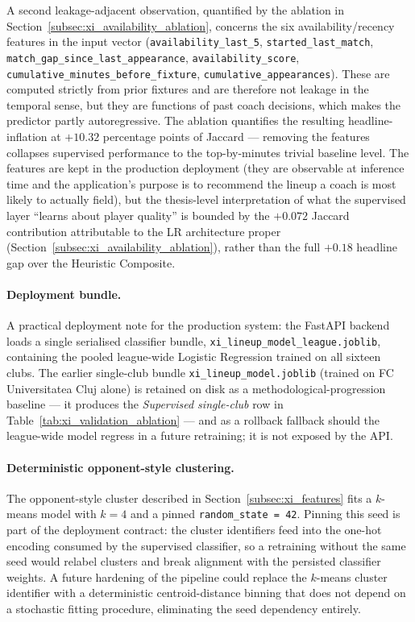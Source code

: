 A second leakage-adjacent observation, quantified by the ablation in Section~\ref{subsec:xi_availability_ablation}, concerns the six availability/recency features in the input vector (\texttt{availability\_last\_5}, \texttt{started\_last\_match}, \texttt{match\_gap\_\allowbreak since\_\allowbreak last\_\allowbreak appearance}, \texttt{availability\_score}, \texttt{cumulative\_minutes\_\allowbreak before\_\allowbreak fixture}, \texttt{cumulative\_\allowbreak appearances}). These are computed strictly from prior fixtures and are therefore not leakage in the temporal sense, but they are functions of past coach decisions, which makes the predictor partly autoregressive. The ablation quantifies the resulting headline-inflation at $+10.32$ percentage points of Jaccard --- removing the features collapses supervised performance to the top-by-minutes trivial baseline level. The features are kept in the production deployment (they are observable at inference time and the application's purpose is to recommend the lineup a coach is most likely to actually field), but the thesis-level interpretation of what the supervised layer ``learns about player quality'' is bounded by the $+0.072$ Jaccard contribution attributable to the LR architecture proper (Section~\ref{subsec:xi_availability_ablation}), rather than the full $+0.18$ headline gap over the Heuristic Composite.

\paragraph{Deployment bundle.}
A practical deployment note for the production system: the FastAPI backend loads a single serialised classifier bundle, \texttt{xi\_\allowbreak lineup\_\allowbreak model\_\allowbreak league.joblib}, containing the pooled league-wide Logistic Regression trained on all sixteen clubs. The earlier single-club bundle \texttt{xi\_\allowbreak lineup\_\allowbreak model.joblib} (trained on FC Universitatea Cluj alone) is retained on disk as a methodological-progression baseline --- it produces the \emph{Supervised single-club} row in Table~\ref{tab:xi_validation_ablation} --- and as a rollback fallback should the league-wide model regress in a future retraining; it is not exposed by the API.

\paragraph{Deterministic opponent-style clustering.}
The opponent-style cluster described in Section~\ref{subsec:xi_features} fits a $k$-means model with $k = 4$ and a pinned \texttt{random\_state = 42}. Pinning this seed is part of the deployment contract: the cluster identifiers feed into the one-hot encoding consumed by the supervised classifier, so a retraining without the same seed would relabel clusters and break alignment with the persisted classifier weights. A future hardening of the pipeline could replace the $k$-means cluster identifier with a deterministic centroid-distance binning that does not depend on a stochastic fitting procedure, eliminating the seed dependency entirely.

